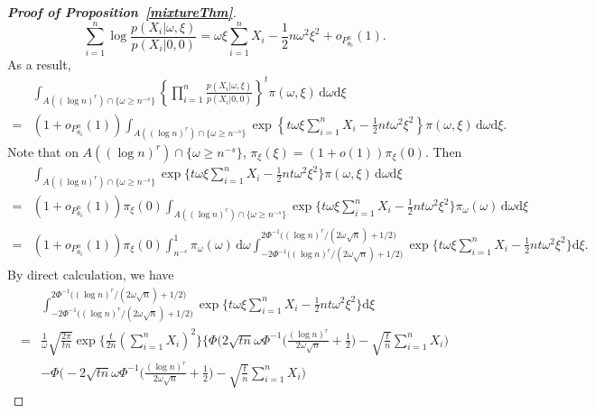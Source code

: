 \documentclass[11pt]{article}
\theoremstyle{plain}
\theoremstyle{definition}
\theoremstyle{remark}
\begin{document}
\begin{appendices}
\begin{proof}[\textbf{Proof of Proposition~\ref{mixtureThm}}]
\begin{equation}\label{eq:mixtureaiya1}
    \sum_{i=1}^n \log \frac{p(X_i|\omega,\xi)}{ p(X_i|0,0)}
    =\omega \xi \sum_{i=1}^n X_i -\frac{1}{2} n\omega^2 \xi^2+o_{P^n_{\theta_0}}(1).
\end{equation}
As a result,
\begin{align*}
    & \int_{A((\log n)^r)\cap \{\omega\geq n^{-s}\}} \left\{ \prod_{i=1}^n \frac{p(X_i|\omega,\xi)}{p(X_i|0,0)} \right\}^t \pi(\omega,\xi)\, \mathrm d\omega \mathrm d\xi
    \\
    =&(1+o_{P^n_{\theta_0}}(1))\int_{A( (\log n)^r )\cap \{\omega\geq  n^{-s}\} } \exp\left\{
        t\omega \xi \sum_{i=1}^n X_i -\frac{1}{2} nt\omega^2 \xi^2
    \right\} \pi(\omega,\xi)\, \mathrm d\omega \mathrm d\xi.
\end{align*}
Note that on $A((\log n)^r)\cap \{\omega\geq n^{-s}\}$, $\pi_{\xi}(\xi)=(1+o(1))\pi_\xi(0)$. Then
\begin{align*}
    &\int_{A((\log n)^r)\cap \{\omega\geq n^{-s}\} } \exp\big\{
        t\omega \xi \sum_{i=1}^n X_i -\frac{1}{2} nt\omega^2 \xi^2
    \big\} \pi(\omega,\xi)\, \mathrm d\omega \mathrm d\xi
    \\
    =&(1+o_{P^n_{\theta_0}}(1))\pi_{\xi}(0)
    \int_{A((\log n)^r)\cap \{\omega\geq  n^{-s}\} } \exp\big\{
        t\omega \xi \sum_{i=1}^n X_i -\frac{1}{2} nt\omega^2 \xi^2
    \big\} \pi_{\omega}(\omega)\, \mathrm  d\omega \mathrm d\xi
    \\
    =&(1+o_{P^n_{\theta_0}}(1))\pi_{\xi}(0)\int_{n^{-s}}^1 \pi_{\omega}(\omega)\, \mathrm d\omega 
    \int_{-2\Phi^{-1}\big((\log n)^r/(2\omega \sqrt{n})+1/2\big)}^{2\Phi^{-1}\big((\log n)^r/(2\omega \sqrt{n})+1/2\big)} \exp\big\{
        t\omega \xi \sum_{i=1}^n X_i -\frac{1}{2} nt\omega^2 \xi^2
    \big\} \mathrm d\xi.
\end{align*}
By direct calculation, we have
\begin{align*}
    &\int_{-2\Phi^{-1}\big((\log n)^r/(2\omega \sqrt{n})+1/2\big)}^{2\Phi^{-1}\big((\log n)^r/(2\omega \sqrt{n})+1/2\big)} \exp\big\{
        t\omega \xi \sum_{i=1}^n X_i -\frac{1}{2} nt\omega^2 \xi^2
\big\} \mathrm d\xi
\\
=&
 \frac{1}{\omega} \sqrt{\frac{2\pi}{tn}}  \exp\Big\{\frac{t}{2n}(\sum_{i=1}^n X_i)^2\Big\}
\bigg\{
    \Phi\bigg(2\sqrt{tn}\omega \Phi^{-1}\Big(\frac{(\log n)^r}{2\omega\sqrt{n}}+\frac 12\Big)-\sqrt{\frac t n} \sum_{i=1}^n X_i\bigg)
    \\
    &
    -
    \Phi\bigg(-2\sqrt{tn}\omega \Phi^{-1}\Big(\frac{(\log n)^r}{2\omega\sqrt{n}}+\frac 12\Big)-\sqrt{\frac t n} \sum_{i=1}^n X_i\bigg)

\end{align*}
\end{proof}
\end{appendices}
\end{document}
